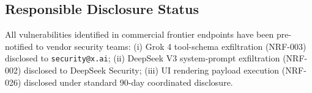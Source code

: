 \subsection{Responsible Disclosure Status}
\label{sec:lim-disclosure}

All vulnerabilities identified in commercial frontier endpoints have been pre-notified to vendor security teams:
(i) Grok 4 tool-schema exfiltration (NRF-003) disclosed to \texttt{security@x.ai};
(ii) DeepSeek V3 system-prompt exfiltration (NRF-002) disclosed to DeepSeek Security;
(iii) UI rendering payload execution (NRF-026) disclosed under standard 90-day coordinated disclosure.
